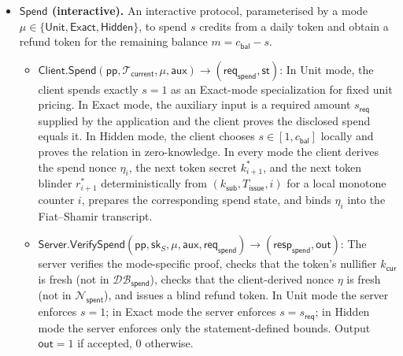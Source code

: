 \documentclass[11pt]{article}
\theoremstyle{definitionstyle}
\theoremstyle{plain}
\newcommand{\DB}{\mathcal{DB}}
\begin{document}
\begin{itemize}[leftmargin=*]
\begin{itemize}
  \item $\mathsf{Client.Refresh}(\mathsf{pp}, \mathcal{T}_{\mathsf{master}}, T) \to (\mathsf{req}_{\mathsf{ref}}, \mathsf{st})$: The client produces a refresh request including a zero-knowledge proof of a valid master token, the epoch nullifier $N_T$, and a commitment to the epoch-derived daily secret $k_{\mathsf{daily}}$.
  \item $\mathsf{Server.VerifyRefresh}(\mathsf{pp}, \mathsf{sk}_S, T, \mathsf{req}_{\mathsf{ref}}) \to \mathsf{resp}_{\mathsf{ref}} / \bot$: The server verifies the proof, checks that the epoch nullifier $N_T$ is fresh (not in $\DB_{\mathsf{epoch}}$), and issues a blind BBS+ signature on $(c_{\mathsf{max}}, k_{\mathsf{daily}}, T)$.
  \item $\mathsf{Client.FinalRefresh}(\mathsf{st}, \mathsf{resp}_{\mathsf{ref}}) \to \mathcal{T}_{\mathsf{daily}}$: The client finalizes the daily token $\mathcal{T}_{\mathsf{daily}}$ for epoch $T$.
  \end{itemize}
\item \textbf{$\mathsf{Spend}$ (interactive).} An interactive protocol, parameterised by a mode $\mu \in \{\mathsf{Unit},\mathsf{Exact},\mathsf{Hidden}\}$, to spend $s$ credits from a daily token and obtain a refund token for the remaining balance $m = c_{\mathsf{bal}} - s$.
  \begin{itemize}
  \item $\mathsf{Client.Spend}(\mathsf{pp}, \mathcal{T}_{\mathsf{current}}, \mu, \mathsf{aux}) \to (\mathsf{req}_{\mathsf{spend}}, \mathsf{st})$: In Unit mode, the client spends exactly $s=1$ as an Exact-mode specialization for fixed unit pricing. In Exact mode, the auxiliary input is a required amount $s_{\mathsf{req}}$ supplied by the application and the client proves the disclosed spend equals it. In Hidden mode, the client chooses $s \in [1,c_{\mathsf{bal}}]$ locally and proves the relation in zero-knowledge. In every mode the client derives the spend nonce $\eta_i$, the next token secret $k_{i+1}^*$, and the next token blinder $r_{i+1}^*$ deterministically from $(k_{\mathsf{sub}}, T_{\mathsf{issue}}, i)$ for a local monotone counter $i$, prepares the corresponding spend state, and binds $\eta_i$ into the Fiat--Shamir transcript.
  \item $\mathsf{Server.VerifySpend}(\mathsf{pp}, \mathsf{sk}_S, \mu, \mathsf{aux}, \mathsf{req}_{\mathsf{spend}}) \to (\mathsf{resp}_{\mathsf{spend}}, \mathsf{out})$: The server verifies the mode-specific proof, checks that the token's nullifier $k_{\mathsf{cur}}$ is fresh (not in $\DB_{\mathsf{spend}}$), checks that the client-derived nonce $\eta$ is fresh (not in $\mathcal{N}_{\mathsf{spent}}$), and issues a blind refund token. In Unit mode the server enforces $s=1$; in Exact mode the server enforces $s=s_{\mathsf{req}}$; in Hidden mode the server enforces only the statement-defined bounds. Output $\mathsf{out} = 1$ if accepted, $0$ otherwise.

\end{itemize}
\end{itemize}
\end{document}
